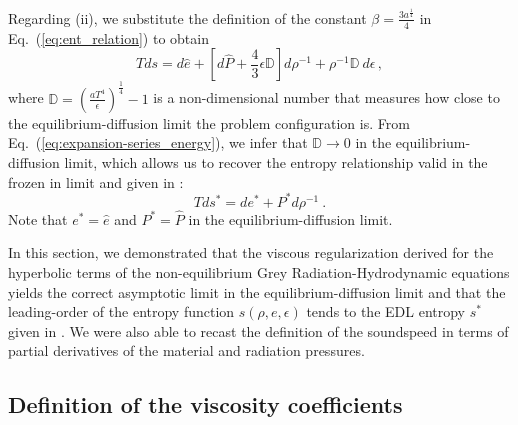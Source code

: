 \documentclass[review]{elsarticle}
\newcommand{\eqt}[1]{Eq.~(\ref{#1})}                     %
\begin{document}
Regarding (ii), we substitute the definition of the constant $\beta = \frac{3a^\frac{1}{4}}{4}$ in \eqt{eq:ent_relation} to obtain
%
\begin{equation}\label{eq:ent_relation2}
Tds = d\hat{e} + \left[ d\hat{P} + \frac{4}{3}\epsilon \mathbb{D} \right] d \rho^{-1} + \rho^{-1}\mathbb{D} \ d \epsilon \,,
\end{equation}
%
where $\mathbb{D} = \left(\frac{aT^4}{\epsilon}\right)^\frac{1}{4}-1$ is a non-dimensional number that measures how close to the equilibrium-diffusion limit the problem configuration is. From \eqt{eq:expansion-series_energy}, we infer that $\mathbb{D} \to 0$ in the equilibrium-diffusion limit, which allows us to recover the entropy relationship valid in the frozen in limit and given in \cite{LowrieMorel}:
%
\begin{equation}
Tds^* = de^* + P^*d \rho^{-1} \ .
\end{equation}
%
Note that $e^* = \hat{e}$ and $P^* = \hat{P}$ in the equilibrium-diffusion limit.
 
In this section, we demonstrated that the viscous regularization derived for the hyperbolic terms of the non-equilibrium Grey Radiation-Hydrodynamic equations yields the correct asymptotic limit in the equilibrium-diffusion limit and that the leading-order  of the entropy function $s(\rho, e, \epsilon)$ tends to the EDL entropy $s^*$ given in \cite{LowrieMorel}. We were also able to recast the definition of the soundspeed in terms of partial derivatives of the material and radiation pressures.

\subsection{Definition of the viscosity coefficients}
\end{document}
